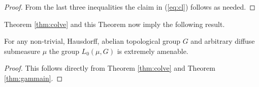 \begin{proof}
  From the last three inequalities the claim in (\ref{eq:cl}) follows as needed.
\end{proof}

Theorem \ref{thm:colve} and this Theorem now imply the following result.

    \begin{thm}
  For any non-trivial, Hausdorff, abelian topological group $G$ and arbitrary diffuse submeasure $\mu$ the group $L_0(\mu, G)$ is extremely amenable.
\end{thm}

\begin{proof}
  This follows directly from Theorem \ref{thm:colve} and Theorem \ref{thm:gammain}.
\end{proof}
